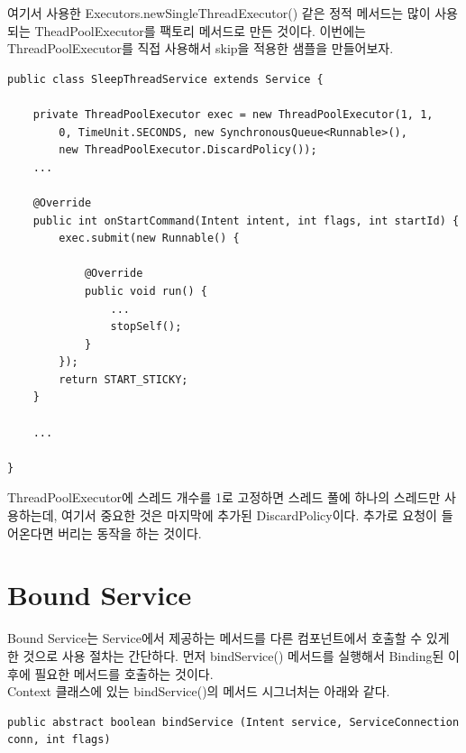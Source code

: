 여기서 사용한 Executors.newSingleThreadExecutor() 같은 정적 메서드는 많이 사용되는 TheadPoolExecutor를 팩토리 메서드로 만든 것이다. 이번에는 ThreadPoolExecutor를 직접 사용해서 skip을 적용한 샘플을 만들어보자.
\begin{lstlisting}[frame=single]
public class SleepThreadService extends Service {
	
	private ThreadPoolExecutor exec = new ThreadPoolExecutor(1, 1, 
		0, TimeUnit.SECONDS, new SynchronousQueue<Runnable>(), 
		new ThreadPoolExecutor.DiscardPolicy());	
	...
		
	@Override
	public int onStartCommand(Intent intent, int flags, int startId) {
		exec.submit(new Runnable() {

			@Override
			public void run() {
				...
				stopSelf();
			}
		});
		return START_STICKY;
	}
	
	...

} 
\end{lstlisting}
ThreadPoolExecutor에 스레드 개수를 1로 고정하면 스레드 풀에 하나의 스레드만 사용하는데, 여기서 중요한 것은 마지막에 추가된 DiscardPolicy이다. 추가로 요청이 들어온다면 버리는 동작을 하는 것이다.

\section{Bound Service}
Bound Service는 Service에서 제공하는 메서드를 다른 컴포넌트에서 호출할 수 있게 한 것으로 사용 절차는 간단하다. 
먼저 bindService() 메서드를 실행해서 Binding된 이후에 필요한 메서드를 호출하는 것이다.\\

Context 클래스에 있는 bindService()의 메서드 시그너처는 아래와 같다.
\begin{lstlisting}[frame=single]
public abstract boolean bindService (Intent service, ServiceConnection conn, int flags)
\end{lstlisting}

